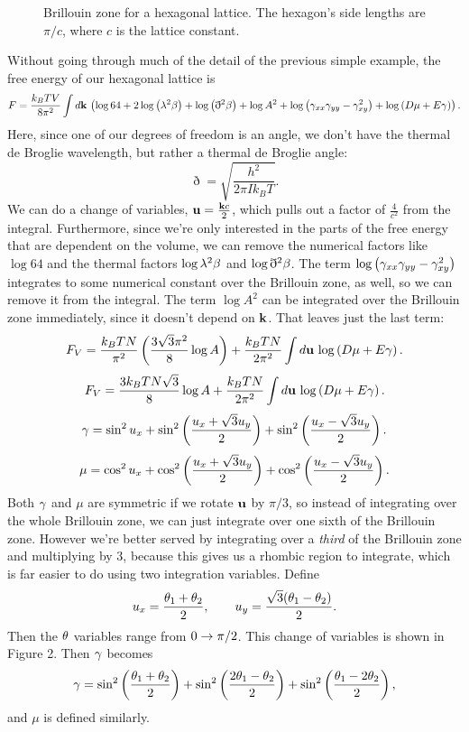 \documentclass[12pt]{article}
\begin{document}
\begin{figure}
\centering
{}
\caption{Brillouin zone for a hexagonal lattice. The hexagon's side lengths are $\pi/ c$, where $c$ is the lattice constant.}
\end{figure}

Without going through much of the detail of the previous simple example, the free energy of our hexagonal lattice is
\[ F = \frac{k_BTV}{8\pi^2} \int d\mathbf{k} \, \left( \log 64 + 2\log \left(\lambda^2 \beta\right) + \log\left(\eth^2 \beta\right) + \log A^2 + \log \left(\gamma_{xx} \gamma_{yy} - \gamma_{xy}^2\right) + \log \left(D\mu + E\gamma\right) \right) .\]
Here, since one of our degrees of freedom is an angle, we don't have the thermal de Broglie wavelength, but rather a thermal de Broglie angle:
\[ \eth = \sqrt{\frac{h^2}{2\pi I k_BT}}.\]
We can do a change of variables, $\mathbf{u} = \frac{ \mathbf{k} c}{2}$, which pulls out a factor of $\frac{4}{c^2}$ from the integral. Furthermore, since we're only interested in the parts of the free energy that are dependent on the volume, we can remove the numerical factors like $\log 64$ and the thermal factors $\log \lambda^2 \beta$ and $\log \eth^2 \beta$. The term $\log \left(\gamma_{xx}\gamma_{yy} - \gamma_{xy}^2\right)$ integrates to some numerical constant over the Brillouin zone, as well, so we can remove it from the integral. The term $\log A^2$ can be integrated over the Brillouin zone immediately, since it doesn't depend on $\mathbf{k}$. That leaves just the last term:
\[ F_V = \frac{k_BTN}{\pi^2}\left(\frac{3\sqrt{3} \pi^2}{8}\log A\right) + \frac{k_BTN}{2\pi^2} \int d\mathbf{u} \, \log \left(D\mu + E\gamma\right).\]
\[ F_V = \frac{3k_BT N \sqrt{3}}{8}\log A + \frac{k_BTN}{2\pi^2} \int d\mathbf{u}\, \log \left(D\mu + E\gamma\right).\]
\[ \gamma = \sin^2u_x + \sin^2\left(\frac{u_x+\sqrt{3} u_y}{2}\right) + \sin^2 \left(\frac{u_x - \sqrt{3}u_y}{2}\right).\]
\[ \mu = \cos^2u_x + \cos^2\left(\frac{u_x+\sqrt{3} u_y}{2}\right) + \cos^2 \left(\frac{u_x - \sqrt{3}u_y}{2}\right).\]
Both $\gamma$ and $\mu$ are symmetric if we rotate $\mathbf{u}$ by $\pi/3$, so instead of integrating over the whole Brillouin zone, we can just integrate over one sixth of the Brillouin zone. However we're better served by integrating over a \emph{third} of the Brillouin zone and multiplying by 3, because this gives us a rhombic region to integrate, which is far easier to do using two integration variables. Define
\[ u_x = \frac{\theta_1 + \theta_2}{2},\qquad u_y = \frac{\sqrt{3}(\theta_1-\theta_2)}{2}.\]
Then the $\theta$ variables range from $0\rightarrow \pi/2$. This change of variables is shown in Figure 2. Then $\gamma$ becomes
\[ \gamma = \sin^2\left(\frac{\theta_1+\theta_2}{2}\right) + \sin^2 \left(\frac{2\theta_1 - \theta_2}{2}\right) + \sin^2 \left(\frac{\theta_1 - 2\theta_2}{2}\right),\]
and $\mu$ is defined similarly.
\end{document}
